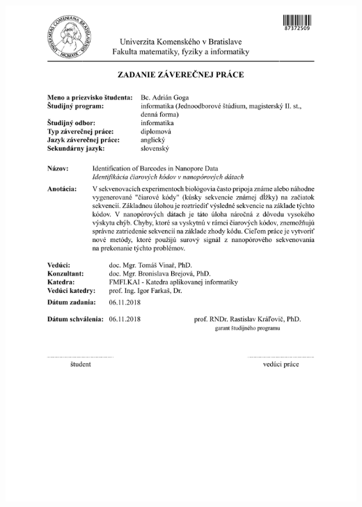 \documentclass[12pt, twoside]{book}
\begin{document}
\newpage 
\thispagestyle{empty}
\hspace{-2cm}\includegraphics[width=1.1\textwidth]{images/zadanie_sk.PDF}
\newpage 
\thispagestyle{empty}
\end{document}
